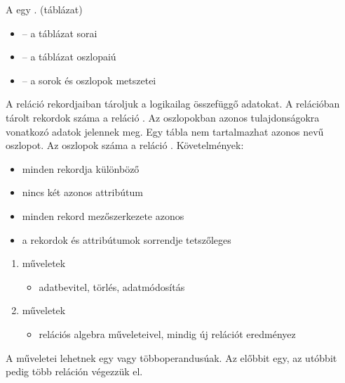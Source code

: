 \documentclass[main.tex]{subfiles}
\begin{document}
  A  egy . (táblázat)
  \begin{itemize}
    \item {} \tabto{2.5cm} – \tabto{3.2cm}
    a táblázat sorai
    
    \item {} \tabto{2.5cm} – \tabto{3.2cm}
    a táblázat oszlopaiú

    \item {} \tabto{2.5cm} – \tabto{3.2cm}
    a sorok és oszlopok metszetei
  \end{itemize}

  A reláció rekordjaiban tároljuk a logikailag összefüggő adatokat.
  A relációban tárolt rekordok száma a reláció .
  Az oszlopokban azonos tulajdonságokra vonatkozó adatok jelennek meg.
  Egy tábla nem tartalmazhat azonos nevű oszlopot.
  Az oszlopok száma a reláció . Követelmények:
  \begin{itemize}
    \item minden rekordja különböző
    \item nincs két azonos attribútum
    \item minden rekord mezőszerkezete azonos
    \item a rekordok és attribútumok sorrendje tetszőleges
  \end{itemize}
  
  \begin{enumerate}
    \item {} műveletek
    \begin{itemize}
      \item adatbevitel, törlés, adatmódosítás
    \end{itemize}

    \item {} műveletek
    \begin{itemize}
      \item relációs algebra műveleteivel,
      mindig új relációt eredményez
    \end{itemize}
  \end{enumerate}

  A  műveletei lehetnek
  egy vagy többoperandusúak. Az előbbit egy, az
  utóbbit pedig több reláción végezzük el.
  
\end{document}
